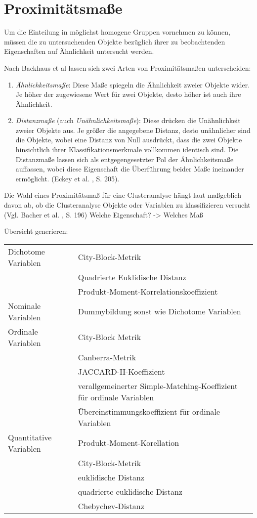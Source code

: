 \chapter{Proximitätsmaße}

Um die Einteilung in möglichst homogene Gruppen vornehmen zu können, müssen die zu untersuchenden Objekte bezüglich ihrer zu beobachtenden Eigenschaften auf Ähnlichkeit untersucht werden. 

Nach Backhaus et al \cite{Backhaus.2016} lassen sich zwei Arten von Proximitätsmaßen unterscheiden:

\begin{enumerate}
	\item \textit{Ähnlichkeitsmaße}: Diese Maße spiegeln die Ähnlichkeit zweier Objekte wider. Je höher der zugewiesene Wert für zwei Objekte, desto höher ist auch ihre Ähnlichkeit.
	\item \textit{Distanzmaße} (auch \textit{Unähnlichkeitsmaße}): Diese drücken die Unähnlichkeit zweier Objekte aus. Je größer die angegebene Distanz, desto unähnlicher sind die Objekte, wobei eine Distanz von Null ausdrückt, dass die zwei Objekte hinsichtlich ihrer Klassifikationsmerkmale vollkommen identisch sind. Die Distanzmaße lassen sich als entgegengesetzter Pol der Ähnlichkeitsmaße auffassen, wobei diese Eigenschaft die Überführung beider Maße ineinander ermöglicht. (Eckey et al. \cite{Eckey.2002}, S. 205).
\end{enumerate}

Die Wahl eines Proximitätsmaß für eine Clusteranalyse hängt laut maßgeblich davon ab, ob die Clusteranalyse Objekte oder Variablen zu klassifizieren versucht (Vgl. Bacher et al. \cite{Bacher.2010}, S. 196) Welche Eigenschaft? -> Welches Maß

Übersicht generieren: 

\begin{tabular}{|l|l|}
	 \hline
	 Dichotome Variablen & City-Block-Metrik \\
	 & Quadrierte Euklidische Distanz \\
	 & Produkt-Moment-Korrelationskoeffizient \\ \hline
	 Nominale Variablen & Dummybildung sonst wie Dichotome Variablen \\ \hline
	 Ordinale Variablen & City-Block Metrik \\ 
	 & Canberra-Metrik \\
	 & JACCARD-II-Koeffizient \\
	 & verallgemeinerter Simple-Matching-Koeffizient für ordinale Variablen \\
	 & Übereinstimmungskoeffizient für ordinale Variablen \\ \hline
	 Quantitative Variablen & Produkt-Moment-Korellation \\
	 & City-Block-Metrik \\
	 & euklidische Distanz \\
	 & quadrierte euklidische Distanz \\
	 & Chebychev-Distanz \\ \hline
\end{tabular}


